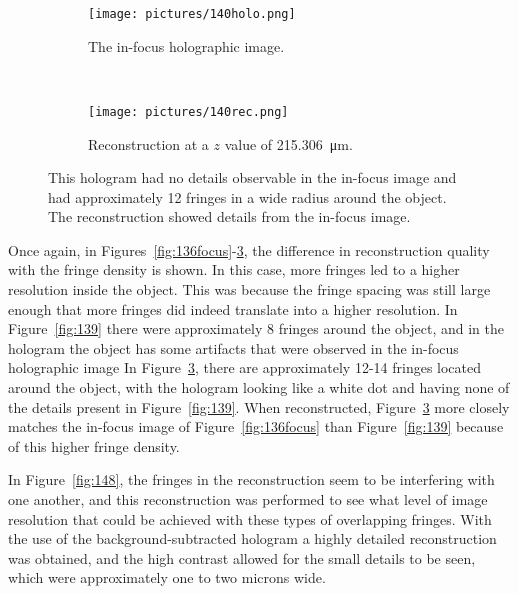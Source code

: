 \begin{figure}[ht!]
    \begin{center}

        \begin{subfigure}[t]{0.4\textwidth}
            \label{fig:140holo}
            \texttt{[image: pictures/140holo.png]}
            \caption{The in-focus holographic image.}
        \end{subfigure}
        \\
        \begin{subfigure}[t]{\textwidth}
            \label{fig:140rec}
            \texttt{[image: pictures/140rec.png]}
            \caption{Reconstruction at a $z$ value of
                \SI{215.306}{\micro\meter}.}
        \end{subfigure}


    \end{center}
    \caption{%
        This hologram had no details observable in the in-focus image and had
        approximately 12 fringes in a wide radius around the object. The
        reconstruction showed details from the in-focus image.
    }%
    \label{fig:140}
\end{figure}

Once again, in Figures~\ref{fig:136focus}-\ref{fig:140}, the difference in
reconstruction quality with the fringe density is shown. In this case, 
more fringes led to a higher
resolution inside the object. This was because the fringe spacing was still
large enough that more fringes did indeed translate into a higher resolution.
In Figure~\ref{fig:139} there were approximately
8 fringes around the object, and in the hologram the object has some
artifacts that were observed in the in-focus holographic image
In Figure~\ref{fig:140}, there are approximately
12-14 fringes located around the object, with the hologram looking like a white
dot and having none of the details present in Figure~\ref{fig:139}. When reconstructed,
Figure~\ref{fig:140} more closely matches the in-focus image of
Figure~\ref{fig:136focus} than Figure~\ref{fig:139} because of this higher
fringe density.

In Figure~\ref{fig:148}, the fringes in the reconstruction seem to be
interfering with one another, and this reconstruction was performed to see what
level of image resolution that could be achieved with these types of overlapping fringes.
With the use of the background-subtracted hologram a highly detailed
reconstruction was obtained, and the high contrast allowed for the small
details to be seen, which were
approximately one to two microns wide.


